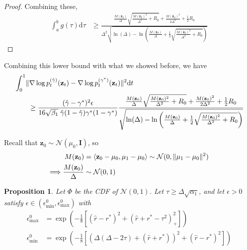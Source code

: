 \documentclass[11pt]{article}
\newcommand{\fitparenth}[1]{\left(#1\right)}
\newcommand{\fitbracket}[1]{\left[#1\right]}
\newcommand{\inprod}[1]{\left\langle#1\right\rangle}
\newcommand{\vect}[1]{\mathbf{#1}}
\theoremstyle{plain}
\newtheorem{proposition}[theorem]{Proposition}
\newcommand{\1}{\mathbbm{1}}
\DeclarePairedDelimiter{\norm}{\lVert}{\rVert}
\newcommand{\pdist}[2][]{p_{#1}^{(#2)}}
\newcommand{\separation}{\Delta}
\begin{document}
\begin{appendices}
\begin{proof}
    Combining these, 
    \begin{align*}
        \int_a^b g(\tau)\mathrm{d}\tau &\geq \frac{\frac{M(\vect z_0)}{\separation}\sqrt{\frac{M(\vect z_0)^2}{\separation^2} + R_0}+\frac{M(\vect z_0)^2}{2\separation^2} + \frac{1}{2}R_0}{\separation^2\sqrt{\ln(\separation)- \ln\fitparenth{\frac{M(\vect z_0)}{\separation}+ \frac{1}{2}\sqrt{\frac{M(\vect z_0)^2}{\separation^2} + R_0}}}}
    \end{align*}
\end{proof}



Combining this lower bound with what we showed before, we have 
\begin{align*}
    &\int_0^1\norm{\nabla \log \pdist[t]{\hat \gamma}(\vect z_t) - \nabla \log \pdist[t]{\gamma^{*}}(\vect z_t)}^2 \mathrm{d}t
    \\
    &\quad\quad\geq\frac{(\hat \gamma-\gamma^*)^2 \epsilon}{16\sqrt{\beta_1}\;\hat  \gamma (1-\hat \gamma) \gamma^* (1-\gamma^*)} \frac{\frac{M(\vect z_0)}{\separation}\sqrt{\frac{M(\vect z_0)^2}{\separation^2} + R_0}+\frac{M(\vect z_0)^2}{2\separation^2} + \frac{1}{2}R_0}{\sqrt{\ln(\separation)- \ln\fitparenth{\frac{M(\vect z_0)}{\separation}+ \frac{1}{2}\sqrt{\frac{M(\vect z_0)^2}{\separation^2} + R_0}}}}
\end{align*}

Recall that $\vect z_0\sim \mathcal{N}(\mu_0, \vect I)$, so 
\begin{align*}
    M(\vect z_0) &= \inprod{\vect z_0 -\mu_0, \mu_1-\mu_0} \sim \mathcal{N}(0, \norm{\mu_1-\mu_0}^2)
    \\
    \Longrightarrow \frac{M(\vect z_0)}{\separation}&\sim \mathcal{N}(0,1)
\end{align*}

\begin{proposition}\label{prop:c0_lowerbound}
    Let $\Phi$ be the CDF of $\mathcal{N}(0,1)$. Let $\tau\geq \separation \sqrt{\alpha_1}$, and let $\epsilon>0$ satisfy $ \epsilon \in (\epsilon_{\mathrm{min}}^0, \epsilon_{\mathrm{max}}^0)$ with 
    \begin{align*}
    \epsilon_{\mathrm{max}} ^0& =\exp\fitparenth{-\frac{1}{8}\fitbracket{(\hat r-r^*)^2 + \fitparenth{\hat r+r^*-\tau^2}_+^2}}
    \\
    \epsilon_{\mathrm{min}}^0 &= \exp\fitparenth{-\frac{1}{8}\fitbracket{(\separation(\separation - 2\tau)+(\hat r+r^*))^2 + (\hat r-r^*)^2}}
    \end{align*}
    

\end{proposition}
\end{appendices}
\end{document}
